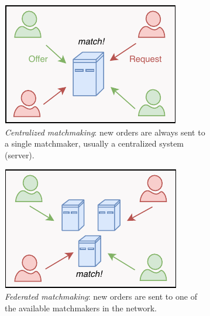 \begin{figure}[t]
	\centering
	\begin{subfigure}[t]{.33\textwidth}
		\centering
		\captionsetup{width=.9\linewidth}
		\includegraphics[width=.9\linewidth]{introduction/assets/centralized_matchmaking}
		\caption{\emph{Centralized matchmaking}: new orders are always sent to a single matchmaker, usually a centralized system (server).}
		\label{fig:centralized_matchmaking}
	\end{subfigure}%
	\begin{subfigure}[t]{.33\textwidth}
		\centering
		\captionsetup{width=.9\linewidth}
		\includegraphics[width=.9\linewidth]{introduction/assets/federated_matchmaking}
		\caption{\emph{Federated matchmaking}: new orders are sent to one of the available matchmakers in the network.}
		\label{fig:federated_matchmaking}
	\end{subfigure}%
	\begin{subfigure}[t]{.33\textwidth}
		\centering
		\captionsetup{width=.9\linewidth}

\end{subfigure}
\end{figure}
